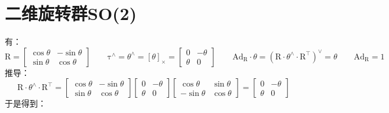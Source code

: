 \documentclass[12pt, onecolumn]{article}
\newcommand\normf{\fangsong}
\newcommand\skewmat[1]{\left[ #1 \right]_\times}
\newcommand\liehat[1]{#1^{\land}}
\newcommand\lievee[1]{#1^\vee}
\newcommand\bsm[1]{\boldsymbol{\mathrm{#1}}}
\begin{document}
	\section{\normf 二维旋转群SO(2)}
	有：
	\begin{equation}
	\bsm{R}=\begin{bmatrix}
	\cos\theta&-\sin\theta\\
	\sin\theta&\cos\theta
	\end{bmatrix}
	\qquad
	\liehat{\bsm{\tau}}=\liehat{\theta}=\skewmat{{\theta}}=\begin{bmatrix}
	0&-\theta\\
	\theta&0
	\end{bmatrix}
	\qquad
	\bsm{Ad}_{\bsm{R}}\cdot\theta=\lievee{\left(\bsm{R}\cdot\liehat{\theta}\cdot\bsm{R}^\top \right) }=\theta
	\qquad
	\bsm{Ad}_{\bsm{R}}=1
	\end{equation}
	推导：
	\begin{equation}
	\bsm{R}\cdot\liehat{\theta}\cdot\bsm{R}^\top =
	\begin{bmatrix}
		\cos\theta&-\sin\theta\\
		\sin\theta&\cos\theta
		\end{bmatrix}\begin{bmatrix}
			0&-\theta\\
			\theta&0
			\end{bmatrix}\begin{bmatrix}
					\cos\theta&\sin\theta\\
					-\sin\theta&\cos\theta
					\end{bmatrix}=\begin{bmatrix}
						0&-\theta\\
						\theta&0
						\end{bmatrix}
	\end{equation}
	于是得到：
\end{document}

